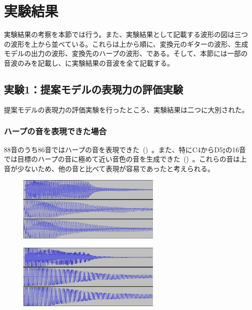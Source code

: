 \clearpage

\section{実験結果}
\label{sec:result}

実験結果の考察を本節では行う。また、実験結果として記載する波形の図は三つの波形を上から並べている。これらは上から順に、変換元のギターの波形、生成モデルの出力の波形、変換先のハープの波形、である。そして、本節には一部の音波のみを記載し、に実験結果の音波を全て記載する。

\subsection{実験1：提案モデルの表現力の評価実験}

提案モデルの表現力の評価実験を行ったところ、実験結果は二つに大別された。

\subsubsection{ハープの音を表現できた場合}

88音のうち86音ではハープの音を表現できた~()~。また、特にC4からD5$\sharp$の16音では目標のハープの音に極めて近い音色の音を生成できた~()~。これらの音は上音が少ないため、他の音と比べて表現が容易であったと考えられる。

\begin{figure}[b]
\centering
\begin{minipage}[b]{0.48\columnwidth}
\centering
\includegraphics[height=90pt]{figure/88_88/f3.png}
\label{fig:88_88_good1}
\end{minipage}
\begin{minipage}[b]{0.48\columnwidth}
\centering
\includegraphics[height=90pt]{figure/88_88/c4.png}
\label{fig:88_88_good2}
\end{minipage}
\caption[実験1：ハープの音を表現できた音波]{}
\end{figure}

